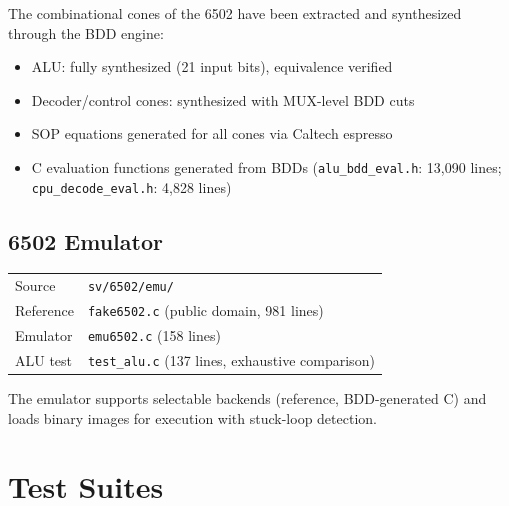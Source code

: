 \documentclass[11pt]{article}
\begin{document}
The combinational cones of the 6502 have been extracted and
synthesized through the BDD engine:
\begin{itemize}[nosep]
\item ALU: fully synthesized (21 input bits), equivalence verified
\item Decoder/control cones: synthesized with MUX-level BDD cuts
\item SOP equations generated for all cones via Caltech espresso
\item C evaluation functions generated from BDDs
  (\texttt{alu\_bdd\_eval.h}: 13,090 lines;
   \texttt{cpu\_decode\_eval.h}: 4,828 lines)
\end{itemize}

\subsection{6502 Emulator}

\begin{tabular}{@{}ll@{}}
\toprule
Source & \texttt{sv/6502/emu/} \\
Reference & \texttt{fake6502.c} (public domain, 981 lines) \\
Emulator & \texttt{emu6502.c} (158 lines) \\
ALU test & \texttt{test\_alu.c} (137 lines, exhaustive comparison) \\
\bottomrule
\end{tabular}

\medskip\noindent
The emulator supports selectable backends (reference, BDD-generated C)
and loads binary images for execution with stuck-loop detection.

\section{Test Suites}
\end{document}
